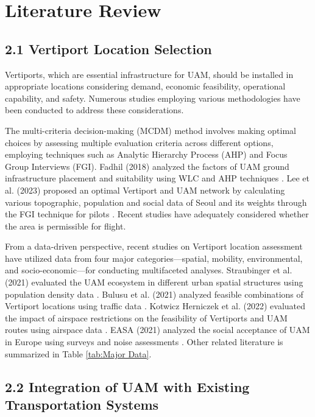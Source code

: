 \section{Literature Review}
\subsection{2.1 Vertiport Location Selection}
Vertiports, which are essential infrastructure for UAM, should be installed in appropriate locations considering demand, economic feasibility, operational capability, and safety. Numerous studies employing various methodologies have been conducted to address these considerations.

The multi-criteria decision-making (MCDM) method involves making optimal choices by assessing multiple evaluation criteria across different options, employing techniques such as Analytic Hierarchy Process (AHP) and Focus Group Interviews (FGI). Fadhil (2018) analyzed the factors of UAM ground infrastructure placement and suitability using WLC and AHP techniques \cite{fadhil2018gis}. Lee et al. (2023) proposed an optimal Vertiport and UAM network by calculating various topographic, population and social data of Seoul and its weights through the FGI technique for pilots \cite{lee2023}. Recent studies have adequately considered whether the area is permissible for flight. 

From a data-driven perspective, recent studies on Vertiport location assessment have utilized data from four major categories—spatial, mobility, environmental, and socio-economic—for conducting multifaceted analyses. Straubinger et al. (2021) evaluated the UAM ecosystem in different urban spatial structures using population density data \cite{straubinger2021_employment}. Bulusu et al. (2021) analyzed feasible combinations of Vertiport locations using traffic data \cite{bulusu2021}. Kotwicz Herniczek et al. (2022) evaluated the impact of airspace restrictions on the feasibility of Vertiports and UAM routes using airspace data \cite{kotwicz_airspace}. EASA (2021) analyzed the social acceptance of UAM in Europe using surveys and noise assessments \cite{easa2021study}. Other related literature is summarized in Table \ref{tab:Major Data}.


\subsection{2.2 Integration of UAM with Existing Transportation Systems}

